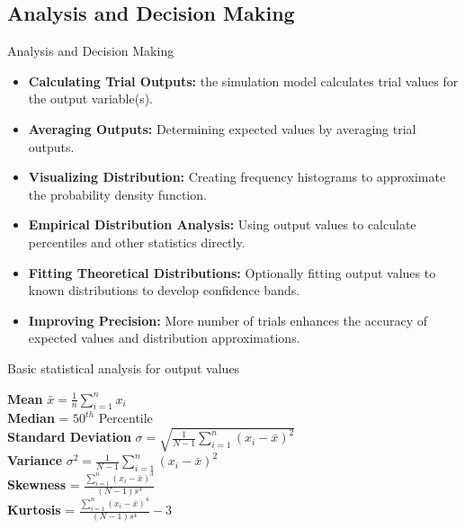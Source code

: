 \documentclass{beamer}
\begin{document}
    \subsection{Analysis and Decision Making}
    \begin{frame}{Analysis and Decision Making}
        \vspace{2em}
        \begin{itemize}
            \item<1-> \textbf{Calculating Trial Outputs:} the simulation model calculates trial values for the output variable(s). 
            \item<2-> \textbf{Averaging Outputs:} Determining expected values by averaging trial outputs.
            \item<3-> \textbf{Visualizing Distribution:} Creating frequency histograms to approximate the probability density function.
            \item<4-> \textbf{Empirical Distribution Analysis:} Using output values to calculate percentiles and other statistics directly.
            \item<5-> \textbf{Fitting Theoretical Distributions:} Optionally fitting output values to known distributions to develop confidence bands.
            \item<6-> \textbf{Improving Precision:} More number of trials enhances the accuracy of expected values and distribution approximations.
        \end{itemize}
    \end{frame}

    \begin{frame}{Basic statistical analysis for output values}
        \begin{center}
            \textbf{Mean} $\bar{x} = \frac{1}{n} \sum_{i=1}^{n} x_i$\\
            \vspace{1em}
            \textbf{Median} = $50^{th}$ Percentile\\
            \vspace{1em}
            \textbf{Standard Deviation} $\sigma = \sqrt{\frac{1}{N-1} \sum_{i=1}^{n} (x_i - \bar{x})^2}$\\
            \vspace{1em}
            \textbf{Variance} $\sigma^2 = \frac{1}{N-1} \sum_{i=1}^{n} (x_i - \bar{x})^2$\\
            \vspace{1em}
            \textbf{Skewness} = $\frac{\sum_{i=1}^{n} (x_i - \bar{x})^3}{(N-1)s^3}$\\
            \vspace{1em}
            \textbf{Kurtosis} = $\frac{\sum_{i=1}^{n} (x_i - \bar{x})^4}{(N-1)s^4}-3$
        \end{center}
    \end{frame}
\end{document}

